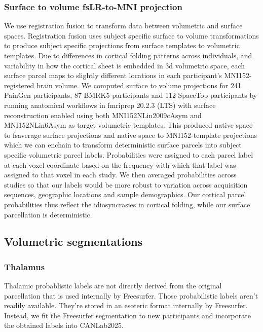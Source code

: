 \documentclass[10pt,letterpaper]{article}
\begin{document}
\subsubsection{Surface to volume fsLR-to-MNI projection} We use registration fusion  to transform data between volumetric and surface spaces. Registration fusion uses subject specific surface to volume transformations to produce subject specific projections from surface templates to volumetric templates. Due to differences in cortical folding patterns across individuals, and variability in how the cortical sheet is embedded in 3d volumetric space, each surface parcel maps to slightly different locations in each participant's MNI152-registered brain volume. We computed surface to volume projections for 241 PainGen participants, 87 BMRK5 participants and 112 SpaceTop participants by running anatomical workflows in fmriprep 20.2.3 (LTS) with surface reconstruction enabled using both MNI152NLin2009cAsym and MNI152NLin6Asym as target volumetric templates. This produced native space to fsaverage surface projections and native space to MNI152-template projections which we can enchain to transform deterministic surface parcels into subject specific volumetric parcel labels. Probabilities were assigned to each parcel label at each voxel coordinate based on the frequency with which that label was assigned to that voxel in each study. We then averaged probabilities across studies so that our labels would be more robust to variation across acquisition sequences, geographic locations and sample demographics. Our cortical parcel probabilities thus reflect the idiosyncrasies in cortical folding, while our surface parcellation is deterministic. 

\subsection{Volumetric segmentations}

\subsubsection{Thalamus} Thalamic probablistic labels are not directly derived from the original parcellation  that is used internally by Freesurfer. Those probabilistic labels aren't readily available. They're stored in an esoteric format internally by Freesurfer. Instead, we fit the Freesurfer segmentation to new participants and incorporate the obtained labels into CANLab2025.
\end{document}
